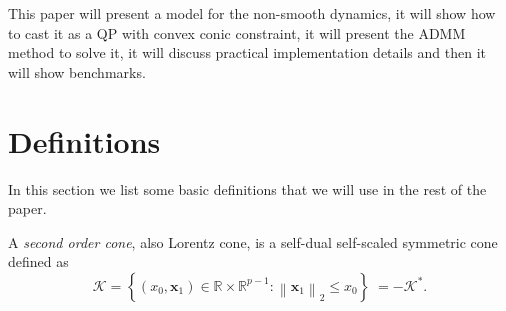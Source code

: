 \documentclass[AMA,STIX1COL]{WileyNJD-v2}
\newcommand{\vect}[1]{\bm{#1}}
\newcommand{\norm}[1]{\left\lVert#1\right\rVert}
\begin{document}
This paper will present a model for the non-smooth dynamics, it will show how to cast it as a QP with convex conic constraint, it will present the ADMM method to solve it, it will discuss practical implementation details and then it will show benchmarks.





    
    \begin{table}[!t]
       \begin{framed}
         \printnomenclature
       \end{framed}
    \end{table}
    
    

\section{Definitions}

In this section we list some basic definitions that we will use in the rest of the paper. 

\begin{definition}
A \textit{second order cone}, also Lorentz cone, is a self-dual self-scaled symmetric cone defined as
\begin{equation}
\label{eq:lorentzcone}
\mathcal{K} 
= \left \{ (x_0,\vect{x}_1) \in \mathbb{R} \times \mathbb{R}^{p-1}: \norm{\vect{x}_1}_2 \leq x_0  \right \} 
\; =   -\mathcal{K}^*.
\end{equation}
\end{definition}
\end{document}
